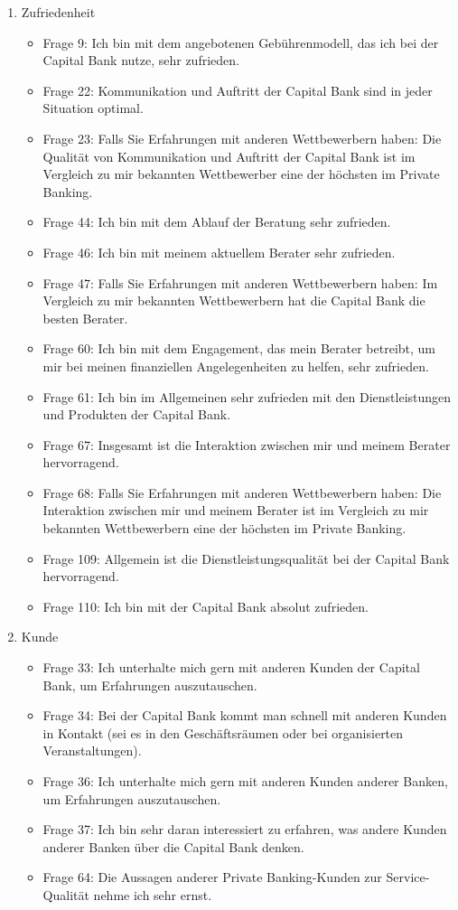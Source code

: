 \documentclass{article}\usepackage[]{graphicx}\usepackage[]{color}
\begin{document}
\begin{enumerate}
		
	\item Zufriedenheit
		\begin{itemize}
			\item Frage 9:
			Ich bin mit dem angebotenen Gebührenmodell, das ich bei der Capital Bank nutze, sehr zufrieden.
			\item Frage 22:
			Kommunikation und Auftritt der Capital Bank sind in jeder Situation optimal.
			\item Frage 23:
			Falls Sie Erfahrungen mit anderen Wettbewerbern haben:
			Die Qualität von Kommunikation und Auftritt der Capital Bank ist im Vergleich zu mir bekannten Wettbewerber eine der höchsten im Private Banking.
			\item Frage 44:
			Ich bin mit dem Ablauf der Beratung sehr zufrieden.
			\item Frage 46:
			Ich bin mit meinem aktuellem Berater sehr zufrieden.
			\item Frage 47:
			Falls Sie Erfahrungen mit anderen Wettbewerbern haben:
			Im Vergleich zu mir bekannten Wettbewerbern hat die Capital Bank die besten Berater.
			\item Frage 60:
			Ich bin mit dem Engagement, das mein Berater betreibt, um mir bei meinen finanziellen Angelegenheiten zu helfen, sehr zufrieden.
			\item Frage 61:
			Ich bin im Allgemeinen sehr zufrieden mit den Dienstleistungen und Produkten der Capital Bank.
			\item Frage 67:
			Insgesamt ist die Interaktion zwischen mir und meinem Berater hervorragend.
			\item Frage 68:
			Falls Sie Erfahrungen mit anderen Wettbewerbern haben:
			Die Interaktion zwischen mir und meinem Berater ist im Vergleich zu mir bekannten Wettbewerbern eine der höchsten im Private Banking.
			\item Frage 109:
			Allgemein ist die Dienstleistungsqualität bei der Capital Bank hervorragend.
			\item Frage 110:
			Ich bin mit der Capital Bank absolut zufrieden.
		\end{itemize}
		
		
	\item Kunde 
		\begin{itemize}
			\item Frage 33:
			Ich unterhalte mich gern mit anderen Kunden der Capital Bank, um Erfahrungen auszutauschen.
			\item Frage 34:
			Bei der Capital Bank kommt man schnell mit anderen Kunden in Kontakt (sei es in den Geschäftsräumen oder bei organisierten Veranstaltungen).
			\item Frage 36:
			Ich unterhalte mich gern mit anderen Kunden anderer Banken, um Erfahrungen auszutauschen.
			\item Frage 37:
			Ich bin sehr daran interessiert zu erfahren, was andere Kunden anderer Banken über die Capital Bank denken.
			\item Frage 64:
			Die Aussagen anderer Private Banking-Kunden zur Service-Qualität nehme ich sehr ernst.
		\end{itemize}
		

\end{enumerate}
\end{document}
